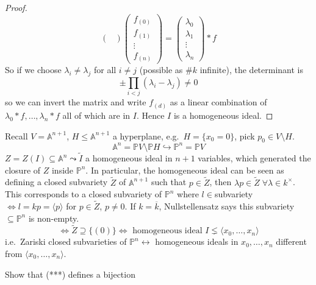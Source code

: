 \documentclass{article}
\newcommand{\A}{\mathbb{A}}
\newcommand{\proj}{\mathbb{P}}
\begin{document}
\begin{proof}
\begin{equation*}
\begin{pmatrix}
        \end{pmatrix}
        \begin{pmatrix}
            f_{(0)} \\f_{(1)} \\ \vdots \\f_{(n)}
        \end{pmatrix}
        =
        \begin{pmatrix}
            \lambda_0 \\ \lambda_1 \\ \vdots \\ \lambda_n
        \end{pmatrix}
        * f
    \end{equation*}
    So if we choose $\lambda_i \neq \lambda_j$ for all $i \neq j$ (possible as $\#k$ infinite), the determinant is
    \begin{equation*}
        \pm \prod_{i < j} (\lambda_i - \lambda_j) \neq 0
    \end{equation*}
    so we can invert the matrix and write $f_{(d)}$ as a linear combination of $\lambda_0 * f, \dotsc, \lambda_n * f$ all of which are in $I$.
    Hence $I$ is a homogeneous ideal.
\end{proof}
Recall $V = \A^{n+1}$, $H \leq \A^{n+1}$ a hyperplane, e.g.\ $H = \{x_0 = 0\}$, pick $p_0 \in V \setminus H$.
\begin{equation*}
    \A^n= \proj V \setminus \proj H \hookrightarrow \proj^n = \proj V
\end{equation*}
$Z = Z(I) \subseteq \A^n \leadsto \tilde{I}$ a homogeneous ideal in $n+1$ variables, which generated the closure of $Z$ inside $\proj^n$.
In particular, the homogeneous ideal can be seen as defining a closed subvariety $\tilde{Z}$ of $\A^{n+1}$ such that $p \in \tilde{Z}$, then $\lambda p \in \tilde{Z} \; \forall \lambda \in k^\times$.
This corresponds to a closed subvariety of $\proj^n$ where $l \in $subvariety $\iff l = k p = \langle p \rangle$ for $p \in \tilde{Z}$, $p \neq 0$.
If $k = \overline{k}$, Nullstellensatz says this subvariety $\subseteq \proj^n$ is non-empty.
\begin{equation*}
    \iff \tilde{Z} \supseteq \{(0)\} \iff \text{ homogeneous ideal } I \lneq \langle x_0, \dotsc, x_n \rangle
\end{equation*}
i.e.\ Zariski closed subvarieties of $\proj^n \leftrightarrow$ homogeneous ideals in $x_0, \dotsc, x_n$ different from $\langle x_0, \dotsc, x_n \rangle$.
\begin{ex}
    Show that (***) defines a bijection
\end{ex}
\end{document}
